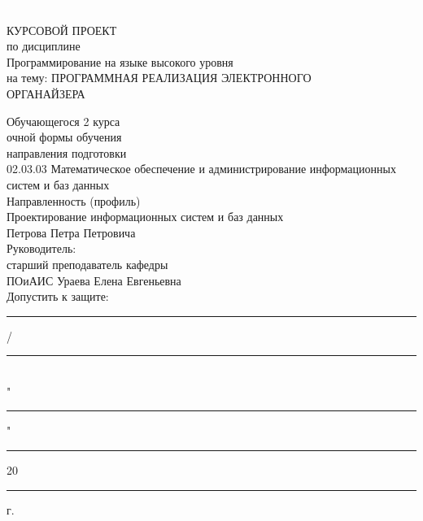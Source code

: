 \pagestyle{fancy}
{
\setlength{\headheight}{0 mm}
\renewcommand{\headrulewidth}{0 mm}
}

\begin{titlepage}
\thispagestyle{titulstyle}
\textcolor{white}{.}
\vspace{6cm}
\begin{center}
КУРСОВОЙ ПРОЕКТ \\
по дисциплине  \\
Программирование на языке высокого уровня\\ 
на тему: ПРОГРАММНАЯ РЕАЛИЗАЦИЯ ЭЛЕКТРОННОГО\\ ОРГАНАЙЗЕРА\\ 
\end{center}
\vspace{1cm}
\flushleft
\setlength{\leftskip}{90mm}
\noindent
Обучающегося 2 курса\\
очной формы обучения\\
направления подготовки\\
02.03.03 Математическое обеспечение и администрирование
информационных систем и баз данных\\
Направленность (профиль)\\
Проектирование информационных систем и баз данных\\
Петрова Петра Петровича\\
Руководитель:\\
старший преподаватель кафедры\\
ПОиАИС Ураева Елена Евгеньевна\\
Допустить к защите: \\
\rule{3cm}{0.25pt} / \rule{3cm}{0.25pt} \\
"\rule{0.6cm}{0.25pt}" \rule{4cm}{0.25pt} 20\rule{0.6cm}{0.25pt} г.
\end{titlepage}

\renewcommand{\headrulewidth}{0 mm}
\setlength{\headheight}{0mm}
\renewcommand{\footrulewidth}{0 mm}
\setlength{\footskip}{12 mm}
\justifying

\addtocounter{page}{1}
